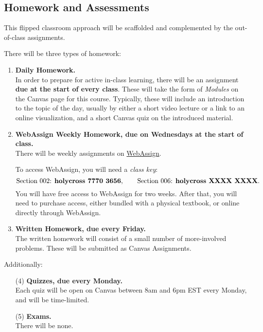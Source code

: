 \documentclass[11pt]{amsart}
\begin{document}
\subsection*{Homework and Assessments}

This flipped classroom approach will be scaffolded and complemented by the out-of-class assignments.

There will be three types of homework:
\begin{enumerate}[(1)]
\item \textbf{Daily Homework.}\\
        In order to prepare for active in-class learning,
        there will be an assignment \textbf{due at the start of every class}.
        These will take the form of \textit{Modules} on the Canvas page for this course.
        Typically, these will include
        an introduction to the topic of the day, usually by either
        a short video lecture or
        a link to an online visualization,
        and a short Canvas quiz on the introduced material.
\item \textbf{WebAssign Weekly Homework, due on Wednesdays at the start of class.}\\
        There will be weekly assignments on \href{https://www.webassign.net}{WebAssign}.

        To access WebAssign, you will need a \textit{class key}:
        \[
                \mbox{Section 002: \textbf{holycross 7770 3656}},
                \qquad
                \mbox{Section 006: \textbf{holycross XXXX XXXX}}.
               
        \]
        You will have free access to WebAssign for two weeks. After that, you will need to purchase access,
        either bundled with a physical textbook, or online directly through WebAssign.

        
\item \textbf{Written Homework, due every Friday.}\\
        The written homework will consist of a small number of more-involved problems.
        These will be submitted as Canvas Assignments.
\end{enumerate}

Additionally:

\begin{enumerate}
\item[(4)] \textbf{Quizzes, due every Monday.}\\
        Each quiz will be open on Canvas between 8am and 6pm EST every Monday, and will be time-limited.
\item[(5)] \textbf{Exams.}\\
        There will be none.
\end{enumerate}
\end{document}
